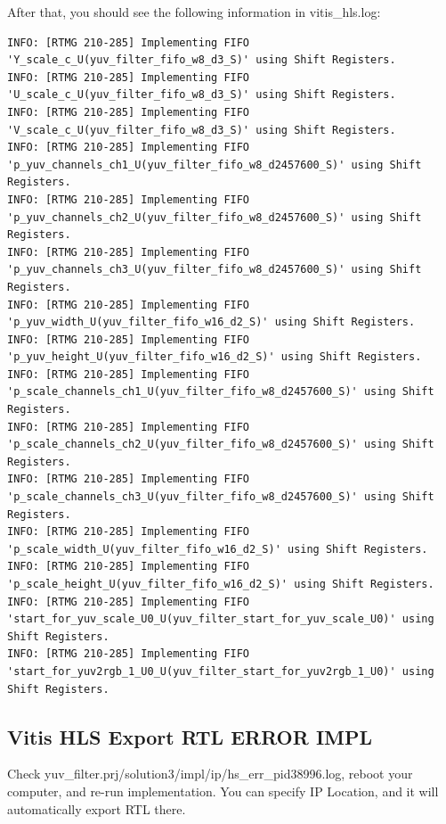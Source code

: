 \documentclass[a4paper,12pt,twoside]{article}
\begin{document}
After that, you should see the following information in vitis\_hls.log:
\begin{verbatim}
INFO: [RTMG 210-285] Implementing FIFO 'Y_scale_c_U(yuv_filter_fifo_w8_d3_S)' using Shift Registers.
INFO: [RTMG 210-285] Implementing FIFO 'U_scale_c_U(yuv_filter_fifo_w8_d3_S)' using Shift Registers.
INFO: [RTMG 210-285] Implementing FIFO 'V_scale_c_U(yuv_filter_fifo_w8_d3_S)' using Shift Registers.
INFO: [RTMG 210-285] Implementing FIFO 'p_yuv_channels_ch1_U(yuv_filter_fifo_w8_d2457600_S)' using Shift Registers.
INFO: [RTMG 210-285] Implementing FIFO 'p_yuv_channels_ch2_U(yuv_filter_fifo_w8_d2457600_S)' using Shift Registers.
INFO: [RTMG 210-285] Implementing FIFO 'p_yuv_channels_ch3_U(yuv_filter_fifo_w8_d2457600_S)' using Shift Registers.
INFO: [RTMG 210-285] Implementing FIFO 'p_yuv_width_U(yuv_filter_fifo_w16_d2_S)' using Shift Registers.
INFO: [RTMG 210-285] Implementing FIFO 'p_yuv_height_U(yuv_filter_fifo_w16_d2_S)' using Shift Registers.
INFO: [RTMG 210-285] Implementing FIFO 'p_scale_channels_ch1_U(yuv_filter_fifo_w8_d2457600_S)' using Shift Registers.
INFO: [RTMG 210-285] Implementing FIFO 'p_scale_channels_ch2_U(yuv_filter_fifo_w8_d2457600_S)' using Shift Registers.
INFO: [RTMG 210-285] Implementing FIFO 'p_scale_channels_ch3_U(yuv_filter_fifo_w8_d2457600_S)' using Shift Registers.
INFO: [RTMG 210-285] Implementing FIFO 'p_scale_width_U(yuv_filter_fifo_w16_d2_S)' using Shift Registers.
INFO: [RTMG 210-285] Implementing FIFO 'p_scale_height_U(yuv_filter_fifo_w16_d2_S)' using Shift Registers.
INFO: [RTMG 210-285] Implementing FIFO 'start_for_yuv_scale_U0_U(yuv_filter_start_for_yuv_scale_U0)' using Shift Registers.
INFO: [RTMG 210-285] Implementing FIFO 'start_for_yuv2rgb_1_U0_U(yuv_filter_start_for_yuv2rgb_1_U0)' using Shift Registers.
\end{verbatim}
\subsection{Vitis HLS Export RTL ERROR IMPL}\label{AImpl}
Check yuv\_filter.prj/solution3/impl/ip/hs\_err\_pid38996.log, reboot your computer, and re-run implementation. You can specify IP Location, and it will automatically export RTL there.
\end{document}
